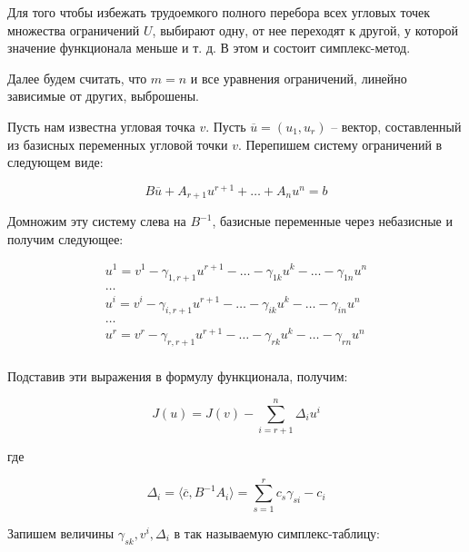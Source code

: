 \documentclass[a4paper, 12pt, titlepage]{article}
\theoremstyle{definition}
\theoremstyle{plain}
\theoremstyle{plain}
\begin{document}
Для того чтобы избежать трудоемкого полного перебора всех угловых точек
множества ограничений $U$, выбирают одну, от нее переходят к другой, у которой
значение функционала меньше и т. д. В этом и состоит симплекс-метод.

Далее будем считать, что $m = n$ и все уравнения ограничений, линейно зависимые
от других, выброшены.

Пусть нам известна угловая точка $v$. Пусть $\overline{u} = (u_{1},
u_{r})$ -- вектор, составленный из базисных переменных угловой точки
$v$. Перепишем систему ограничений в следующем виде:

\begin{equation}
 B \overline{u} + A_{r + 1} u^{r + 1} + \ldots + A_{n} u^{n} = b
\end{equation}

Домножим эту систему слева на $B^{-1}$, базисные переменные через
небазисные и получим следующее:

\begin{equation}
\label{eq:nonfree-via-free}
 \begin{aligned}
  u^{1} = v^{1} - \gamma_{1, r + 1} u^{r + 1} - \ldots - \gamma_{1 k} u^{k} -
  \ldots - \gamma_{1 n} u^{n} \\
  \ldots \\
  u^{i} = v^{i} - \gamma_{i, r + 1} u^{r + 1} - \ldots - \gamma_{i k} u^{k} -
  \ldots - \gamma_{i n} u^{n} \\
  \ldots \\
  u^{r} = v^{r} - \gamma_{r, r + 1} u^{r + 1} - \ldots - \gamma_{r k} u^{k} -
  \ldots - \gamma_{r n} u^{n} \\
 \end{aligned}
\end{equation}

Подставив эти выражения в формулу функционала, получим:

\begin{equation}
 J(u) = J(v) - \sum \limits_{i = r + 1}^{n} \Delta_{i} u^{i}
\end{equation}

где

\begin{equation}
 \Delta_{i} = \langle \overline{c}, B^{-1} A_{i} \rangle =
 \sum \limits_{s = 1}^{r} c_{s} \gamma_{s i} - c_{i}
\end{equation}

Запишем величины $\gamma_{s k}, v^{i}, \Delta_{i}$ в так называемую
симплекс-таблицу:
\end{document}
